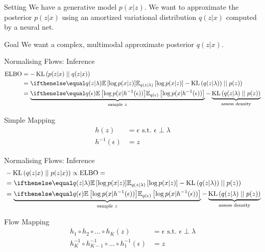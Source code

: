 \documentclass[14pt]{beamer}
\begin{document}
\begin{frame}{Setting}
We have a generative model $ p(x|z) $. We want to approximate the posterior $ p(z|x) $ using an amortized variational distribution $ q(z|x) $ computed by a neural net.
\pause
\begin{block}{Goal}
We want a complex, multimodal approximate posterior $ q(z|x) $.
\end{block}
\end{frame}

\begin{frame}{Normalising Flows: Inference}
\begin{equation*}
\begin{aligned}
\ELBO &= -\KL{p(z|x)}{q(z|x)} \\
&= \E[q(z|\lambda)]{\log p(x|z)} - \KL{q(z|\lambda))}{p(z)} \\
&= \underbrace{\E[q(\epsilon)]{\log p(x|h^{-1}(\epsilon))}}_{\text{sample $ z $}} - \underbrace{\KL{q(z|\lambda)}{p(z)}}_{\text{assess density}}
\end{aligned}
\end{equation*}
\begin{block}{Simple Mapping}
\begin{equation*}
\begin{aligned}
h(z) &= \epsilon \text{ s.t. } \epsilon \perp \lambda \\
h^{-1}(\epsilon) &= z
\end{aligned}
\end{equation*}
\end{block}
\end{frame}

\begin{frame}{Normalising Flows: Inference}
\begin{equation*}
\begin{aligned}
&-\KL{q(z|x)}{p(z|x)} \propto \ELBO = \\
&= \E[q(z|\lambda)]{\log p(x|z)} - \KL{q(z|\lambda))}{p(z)} \\
&= \underbrace{\E[q(\epsilon)]{\log p(x|h^{-1}(\epsilon))}}_{\text{sample $ z $}} - \underbrace{\KL{q(z|\lambda)}{p(z)}}_{\text{assess density}}
\end{aligned}
\end{equation*}
\begin{block}{Flow Mapping}
\begin{equation*}
\begin{aligned}
h_{1}\circ h_{2}\circ \ldots \circ h_{K}(z) &= \epsilon \text{ s.t. } \epsilon \perp \lambda \\
h^{-1}_{K}\circ h^{-1}_{K-1}\circ\ldots \circ h^{-1}_{1}(\epsilon) &= z
\end{aligned}
\end{equation*}
\end{block}
\end{frame}
\end{document}
